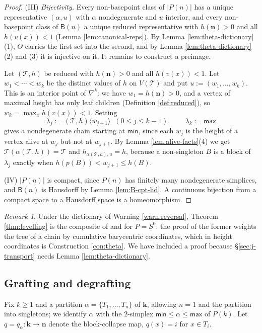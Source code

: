 \documentclass[12pt]{amsart}
\theoremstyle{definition}
\theoremstyle{remark}
\newtheorem{remark}[subsection]{Remark}
\newcommand{\uS}{\underline{S}}
\newcommand{\uSz}{\uS^{0}}                       %
\newcommand{\BC}{\mathsf{B}}                     %
\newcommand{\TreeF}{\mathcal{T}}                 %
\newcommand{\Thet}{\Theta}                       %
\newcommand{\alive}[2]{#1\langle #2\rangle}      %
\begin{document}
\begin{proof}
(III) \emph{Bijectivity.} Every non-basepoint class of $|P(n)|$ has a unique representative $(\alpha, u)$ with $\alpha$ nondegenerate and $u$ interior, and every non-basepoint class of $\BC(n)$ a unique reduced representative with $h(\mathbf{n})>0$ and all $h(v(x))<1$ (Lemma \ref{lem:canonical-reps}). By Lemma \ref{lem:theta-dictionary}(1), $\Thet$ carries the first set into the second, and by Lemma \ref{lem:theta-dictionary}(2) and (3) it is injective on it. It remains to construct a preimage.

Let $(\TreeF,h)$ be reduced with $h(\mathbf{n})>0$ and all $h(v(x))<1$. Let $w_1<\cdots<w_k$ be the distinct values of $h$ on $V(\TreeF)$ and put $u := (w_1,\dots,w_k)$. This is an interior point of $\nabla^k$: we have $w_1 = h(\mathbf{n})>0$, and a vertex of maximal height has only leaf children (Definition \ref{def:reduced}), so $w_k = \max_x h(v(x))<1$. Setting
\[\lambda_j := \alive{(\TreeF,h)}{w_{j+1}} \;\;(0\leq j\leq k-1), \quad\quad \lambda_k := \mathsf{max}\]
gives a nondegenerate chain starting at $\mathsf{min}$, since each $w_j$ is the height of a vertex alive at $w_j$ but not at $w_{j+1}$. By Lemma \ref{lem:alive-facts}(4) we get $\TreeF(\alpha(\TreeF,h)) = \TreeF$ and $h_{\alpha(\TreeF,h),u} = h$, because a non-singleton $B$ is a block of $\lambda_j$ exactly when $h(p(B))<w_{j+1}\leq h(B)$.

(IV) $|P(n)|$ is compact, since $P(n)$ has finitely many nondegenerate simplices, and $\BC(n)$ is Hausdorff by Lemma \ref{lem:B-cpt-hd}. A continuous bijection from a compact space to a Hausdorff space is a homeomorphism.
\end{proof}

\begin{remark}\label{rem:theta-vs-ching}
Under the dictionary of Warning \ref{warn:reversal}, Theorem \ref{thm:levelling} is the composite of \cite[Proposition 4.13]{Ching-thesis} and \cite[Lemma 8.6]{Ching-thesis} for $P = \uSz$: the proof of the former weights the tree of a chain by cumulative barycentric coordinates, which in height coordinates is Construction \ref{con:theta}. We have included a proof because \S\ref{sec:j-transport} needs Lemma \ref{lem:theta-dictionary}.
\end{remark}


\subsection{Grafting and degrafting}\label{sec:grafting}

Fix $k\geq 1$ and a partition $\alpha = \{T_1,\dots,T_n\}$ of $\mathbf{k}$, allowing $n=1$ and the partition into singletons; we identify $\alpha$ with the $2$-simplex $\mathsf{min}\leq \alpha\leq \mathsf{max}$ of $P(k)$. Let $q = q_\alpha\colon \mathbf{k}\to \mathbf{n}$ denote the block-collapse map, $q(x) = i$ for $x\in T_i$.
\end{document}
